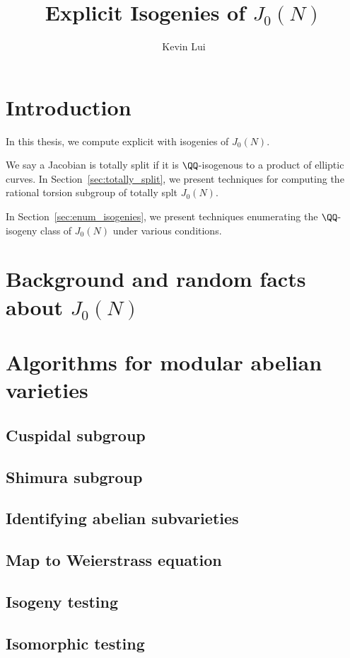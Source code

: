 \documentclass{article}
\author{Kevin Lui}
\title{Explicit Isogenies of $J_0(N)$}
\begin{document}
 
\maketitle
\tableofcontents 
\listoftables

\newpage
\section{Introduction}%
\label{sec:intro}


In this thesis, we compute explicit with isogenies of $J_0(N)$. 

We say a Jacobian is totally split if it is $\QQ$-isogenous to a product of
elliptic curves. In Section~\ref{sec:totally_split}, we present techniques for
computing the rational torsion subgroup of totally splt $J_0(N)$.

In Section~\ref{sec:enum_isogenies}, we present techniques enumerating the
$\QQ$-isogeny class of $J_0(N)$ under various conditions.


\section{Background and random facts about $J_0(N)$}%
\label{sec:back}



\section{Algorithms for modular abelian varieties}

\subsection{Cuspidal subgroup}
\subsection{Shimura subgroup}
\subsection{Identifying abelian subvarieties}
\subsection{Map to Weierstrass equation}
\subsection{Isogeny testing}
\subsection{Isomorphic testing}
\end{document}
